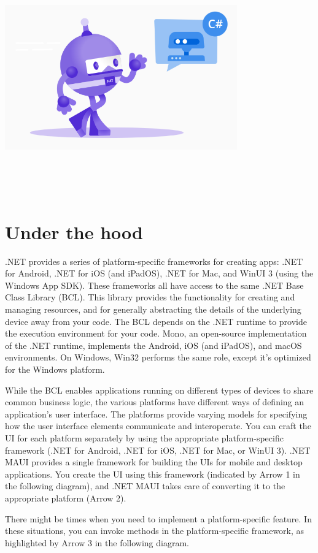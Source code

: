 \documentclass[14pt]{extarticle}
\begin{document}
\begin{center}
    \includegraphics[height=100mm,width=100mm,keepaspectratio]{dotnet-maui-bot.png}
\end{center}

\newpage
\section{Under the hood}

\parbox{\linewidth}{
    \setlength{\parskip}{1em}
    .NET provides a series of platform-specific frameworks for creating apps: .NET for Android, .NET for iOS (and iPadOS), .NET for Mac, and WinUI 3 (using the Windows App SDK). These frameworks all have access to the same .NET Base Class Library (BCL). This library provides the functionality for creating and managing resources, and for generally abstracting the details of the underlying device away from your code. The BCL depends on the .NET runtime to provide the execution environment for your code. Mono, an open-source implementation of the .NET runtime, implements the Android, iOS (and iPadOS), and macOS environments. On Windows, Win32 performs the same role, except it's optimized for the Windows platform.

    While the BCL enables applications running on different types of devices to share common business logic, the various platforms have different ways of defining an application's user interface. The platforms provide varying models for specifying how the user interface elements communicate and interoperate. You can craft the UI for each platform separately by using the appropriate platform-specific framework (.NET for Android, .NET for iOS, .NET for Mac, or WinUI 3). .NET MAUI provides a single framework for building the UIs for mobile and desktop applications. You create the UI using this framework (indicated by Arrow 1 in the following diagram), and .NET MAUI takes care of converting it to the appropriate platform (Arrow 2).

    There might be times when you need to implement a platform-specific feature. In these situations, you can invoke methods in the platform-specific framework, as highlighted by Arrow 3 in the following diagram.

}
\end{document}
